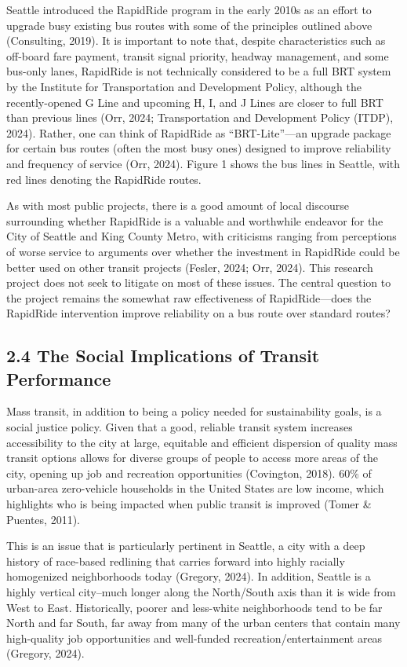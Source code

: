 \documentclass[
  12pt,
]{article}
\begin{document}
Seattle introduced the RapidRide program in the early 2010s as an effort
to upgrade busy existing bus routes with some of the principles outlined
above (Consulting, 2019). It is important to note that, despite
characteristics such as off-board fare payment, transit signal priority,
headway management, and some bus-only lanes, RapidRide is not
technically considered to be a full BRT system by the Institute for
Transportation and Development Policy, although the recently-opened G
Line and upcoming H, I, and J Lines are closer to full BRT than previous
lines (Orr, 2024; Transportation and Development Policy (ITDP), 2024).
Rather, one can think of RapidRide as ``BRT-Lite''---an upgrade package
for certain bus routes (often the most busy ones) designed to improve
reliability and frequency of service (Orr, 2024). Figure 1 shows the bus
lines in Seattle, with red lines denoting the RapidRide routes.

As with most public projects, there is a good amount of local discourse
surrounding whether RapidRide is a valuable and worthwhile endeavor for
the City of Seattle and King County Metro, with criticisms ranging from
perceptions of worse service to arguments over whether the investment in
RapidRide could be better used on other transit projects (Fesler, 2024;
Orr, 2024). This research project does not seek to litigate on most of
these issues. The central question to the project remains the somewhat
raw effectiveness of RapidRide---does the RapidRide intervention improve
reliability on a bus route over standard routes?~

\subsection{2.4 The Social Implications of Transit
Performance}\label{the-social-implications-of-transit-performance}

Mass transit, in addition to being a policy needed for sustainability
goals, is a social justice policy. Given that a good, reliable transit
system increases accessibility to the city at large, equitable and
efficient dispersion of quality mass transit options allows for diverse
groups of people to access more areas of the city, opening up job and
recreation opportunities (Covington, 2018). 60\% of urban-area
zero-vehicle households in the United States are low income, which
highlights who is being impacted when public transit is improved (Tomer
\& Puentes, 2011).

This is an issue that is particularly pertinent in Seattle, a city with
a deep history of race-based redlining that carries forward into highly
racially homogenized neighborhoods today (Gregory, 2024). In addition,
Seattle is a highly vertical city--much longer along the North/South
axis than it is wide from West to East. Historically, poorer and
less-white neighborhoods tend to be far North and far South, far away
from many of the urban centers that contain many high-quality job
opportunities and well-funded recreation/entertainment areas (Gregory,
2024).
\end{document}
